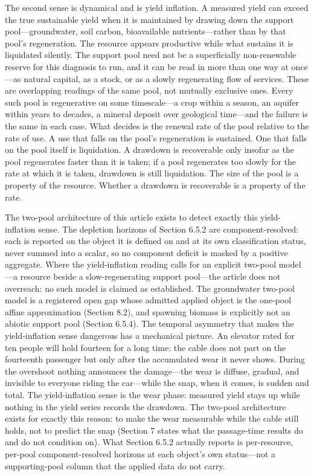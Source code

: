 \documentclass[11pt]{article}
\begin{document}
The second sense is dynamical and is yield inflation. A measured yield
can exceed the true sustainable yield when it is maintained by drawing
down the support pool---groundwater, soil carbon, bioavailable
nutrients---rather than by that pool's regeneration. The resource
appears productive while what sustains it is liquidated silently. The
support pool need not be a superficially non-renewable reserve for this
diagnosis to run, and it can be read in more than one way at once---as
natural capital, as a stock, or as a slowly regenerating flow of
services. These are overlapping readings of the same pool, not mutually
exclusive ones. Every such pool is regenerative on some timescale---a
crop within a season, an aquifer within years to decades, a mineral
deposit over geological time---and the failure is the same in each
case. What decides is the renewal rate of the pool relative to the rate
of use. A use that falls on the pool's regeneration is sustained. One
that falls on the pool itself is liquidation. A drawdown is recoverable
only insofar as the pool regenerates faster than it is taken; if a pool
regenerates too slowly for the rate at which it is taken, drawdown is
still liquidation. The size of the pool is a property of the resource.
Whether a drawdown is recoverable is a property of the rate.

The two-pool architecture of this article exists to detect exactly this
yield-inflation sense. The depletion horizons of Section 6.5.2 are
component-resolved: each is reported on the object it is defined on and
at its own classification status, never summed into a scalar, so no
component deficit is masked by a positive aggregate. Where the
yield-inflation reading calls for an explicit two-pool model---a
resource beside a slow-regenerating support pool---the article does
not overreach: no such model is claimed as established. The groundwater
two-pool model is a registered open gap whose admitted applied object is
the one-pool affine approximation (Section 8.2), and spawning biomass is
explicitly not an abiotic support pool (Section 6.5.4). The temporal
asymmetry that makes the yield-inflation sense dangerous has a
mechanical picture. An elevator rated for ten people will hold fourteen
for a long time: the cable does not part on the fourteenth passenger but
only after the accumulated wear it never shows. During the overshoot
nothing announces the damage---the wear is diffuse, gradual, and
invisible to everyone riding the car---while the snap, when it comes,
is sudden and total. The yield-inflation sense is the wear phase:
measured yield stays up while nothing in the yield series records the
drawdown. The two-pool architecture exists for exactly this reason: to
make the wear measurable while the cable still holds, not to predict the
snap (Section 7 states what the passage-time results do and do not
condition on). What Section 6.5.2 actually reports is per-resource,
per-pool component-resolved horizons at each object's own status---not
a supporting-pool column that the applied data do not carry.
\end{document}
